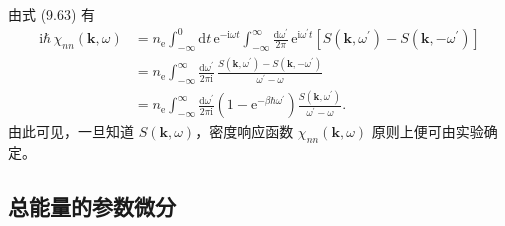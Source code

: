 由式 (9.63) 有
\begin{equation*}
\begin{aligned}
\mathrm{i}\hbar\,\chi_{nn}(\mathbf{k},\omega)&=n_{\mathrm{e}}\int_{-\infty}^{0}\mathrm{d}t\,\mathrm{e}^{-\mathrm{i}\omega t}\int_{-\infty}^{\infty}\frac{\mathrm{d}\omega^{\prime}}{2\pi}\,\mathrm{e}^{\mathrm{i}\omega^{\prime}t}\left[S(\mathbf{k},\omega^{\prime})-S(\mathbf{k},-\omega^{\prime})\right]\\
&=n_{\mathrm{e}}\int_{-\infty}^{\infty}\frac{\mathrm{d}\omega^{\prime}}{2\pi\mathrm{i}}\,\frac{S(\mathbf{k},\omega^{\prime})-S(\mathbf{k},-\omega^{\prime})}{\omega^{\prime}-\omega}\\
&=n_{\mathrm{e}}\int_{-\infty}^{\infty}\frac{\mathrm{d}\omega^{\prime}}{2\pi\mathrm{i}}\left(1-\mathrm{e}^{-\beta\hbar\omega^{\prime}}\right)\frac{S(\mathbf{k},\omega^{\prime})}{\omega^{\prime}-\omega}.
\end{aligned}\tag{9.93}
\end{equation*}
由此可见，一旦知道 $S(\mathbf{k},\omega)$，密度响应函数 $\chi_{nn}(\mathbf{k},\omega)$ 原则上便可由实验确定。

\subsection{总能量的参数微分}

